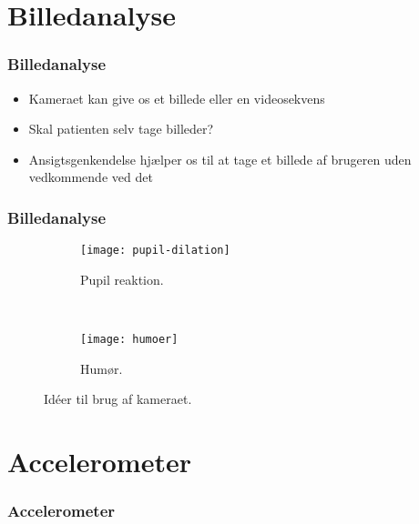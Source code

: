 \section{Billedanalyse}

\begin{frame}
\frametitle{Billedanalyse}
\begin{itemize}
\item Kameraet kan give os et billede eller en videosekvens
\item Skal patienten selv tage billeder?
\item Ansigtsgenkendelse hjælper os til at tage et billede af brugeren uden vedkommende ved det

\end{itemize}
\end{frame}


\begin{frame}
\frametitle{Billedanalyse}
\begin{figure}
\centering
\begin{subfigure}[b]{0.45\textwidth}
	\centering
\texttt{[image: pupil-dilation]}
\caption{Pupil reaktion.}
\end{subfigure}
~~~~
\begin{subfigure}[b]{0.45\textwidth}
	\centering
\texttt{[image: humoer]}
\caption{Humør.}
\end{subfigure}
\caption{Idéer til brug af kameraet.}
\end{figure}

\end{frame}

\section{Accelerometer}
\begin{frame}
\frametitle{Accelerometer}
\end{frame}